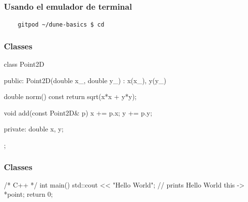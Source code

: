 \documentclass[
	spanish,
	10pt,
	xcolor=table,
	handout,
	aspectratio=1610,
  ignorenonframetext
]{beamer}
\begin{document}
\begin{frame}
  \frametitle{Usando el emulador de terminal}



\end{frame}

\begin{frame}

\end{frame}

\begin{frame}[fragile]
  \begin{lstlisting}
    gitpod ~/dune-basics $ cd
  \end{lstlisting}
\end{frame}

\begin{frame}[fragile]
  \frametitle{Classes}
  \begin{cppcode}
    class Point2D {
        public:
        Point2D(double x_, double y_)
        : x(x_), y(y_)
        {}

        double norm() const {
            return sqrt(x*x + y*y);
          }

        void add(const Point2D& p) {
            x += p.x;
            y += p.y;
          }

        private:
        double x, y;
      };
  \end{cppcode}
\end{frame}

\begin{frame}[fragile]
  \frametitle{Classes}
  \begin{cppcode}
    /* C++ */
    int main() {
        std::cout << "Hello World"; // prints Hello World
        this -> *point;
        return 0;
      }
  \end{cppcode}
\end{frame}
\end{document}
